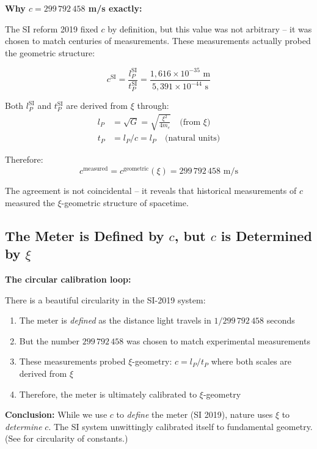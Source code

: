 	\begin{keyresult}
		\textbf{Why $c = 299\,792\,458$ m/s exactly:}
		
		The SI reform 2019 fixed $c$ by definition, but this value was not arbitrary -- it was chosen to match centuries of measurements. These measurements actually probed the geometric structure:
		
		\begin{equation}
			c^{\text{SI}} = \frac{l_P^{\text{SI}}}{t_P^{\text{SI}}} = \frac{1{,}616 \times 10^{-35} \text{ m}}{5{,}391 \times 10^{-44} \text{ s}}
		\end{equation}
		
		Both $l_P^{\text{SI}}$ and $t_P^{\text{SI}}$ are derived from $\xi$ through:
		\begin{align}
			l_P &= \sqrt{G} = \sqrt{\frac{\xi^2}{4m_e}} \quad \text{(from } \xi\text{)} \\
			t_P &= l_P/c = l_P \quad \text{(natural units)}
		\end{align}
		
		Therefore:
		\begin{equation}
			\boxed{c^{\text{measured}} = c^{\text{geometric}}(\xi) = 299\,792\,458 \text{ m/s}}
		\end{equation}
		
		The agreement is not coincidental -- it reveals that historical measurements of $c$ measured the $\xi$-geometric structure of spacetime.
	\end{keyresult}
	
	\subsection{The Meter is Defined by $c$, but $c$ is Determined by $\xi$}
	
	\begin{insight}
		\textbf{The circular calibration loop:}
		
		There is a beautiful circularity in the SI-2019 system:
		
		\begin{enumerate}
			\item The meter is \emph{defined} as the distance light travels in $1/299\,792\,458$ seconds
			\item But the number $299\,792\,458$ was chosen to match experimental measurements
			\item These measurements probed $\xi$-geometry: $c = l_P/t_P$ where both scales are derived from $\xi$
			\item Therefore, the meter is ultimately calibrated to $\xi$-geometry
		\end{enumerate}
		
		\textbf{Conclusion:} While we use $c$ to \emph{define} the meter (SI 2019), nature uses $\xi$ to \emph{determine} $c$. The SI system unwittingly calibrated itself to fundamental geometry. (See \cite{circularity_constants_En} for circularity of constants.)
	\end{insight}
	
